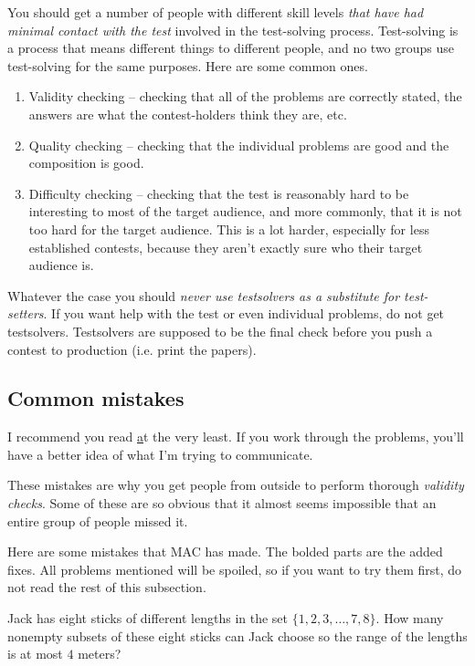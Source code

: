 \documentclass[points=false]{bounce}
\begin{document}
You should get a number of people with different skill levels \emph{that have had minimal contact with the test} involved in the test-solving process. Test-solving is a process that means different things to different people, and no two groups use test-solving for the same purposes. Here are some common ones.
\begin{enumerate}
    \item Validity checking -- checking that all of the problems are correctly stated, the answers are what the contest-holders think they are, etc.
    \item Quality checking -- checking that the individual problems are good and the composition is good.
    \item Difficulty checking -- checking that the test is reasonably hard to be interesting to most of the target audience, and more commonly, that it is not too hard for the target audience. This is a lot harder, especially for less established contests, because they aren't exactly sure who their target audience is. 
\end{enumerate}
Whatever the case you should \emph{never use testsolvers as a substitute for test-setters}. If you want help with the test or even individual problems, do not get testsolvers. Testsolvers are supposed to be the final check before you push a contest to production (i.e. print the papers).

\subsection{Common mistakes}
I recommend you read \href{https://www.dennisc.net/resources/careful.pdf} at the very least. If you work through the problems, you'll have a better idea of what I'm trying to communicate.

These mistakes are why you get people from outside to perform thorough \emph{validity checks}. Some of these are so obvious that it almost seems impossible that an entire group of people missed it.

Here are some mistakes that MAC has made. The bolded parts are the added fixes. All problems mentioned will be spoiled, so if you want to try them first, do not read the rest of this subsection.

\begin{exam}[JMC 2020/11]
    Jack has eight sticks of different lengths in the set $\{1,2,3,\dots,7,8\}$. How many nonempty subsets of these eight sticks can Jack choose so the range of the lengths is at most $4$ meters?
\end{exam}
\end{document}
